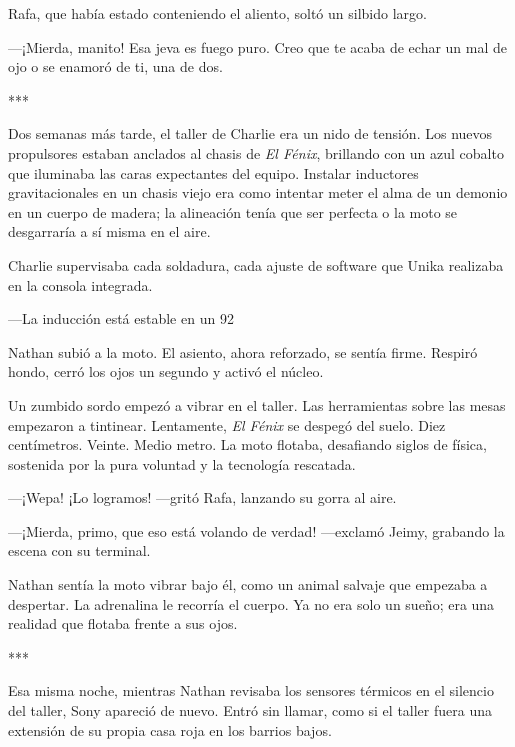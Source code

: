 \documentclass[11pt,twoside]{book}
\begin{document}
Rafa, que había estado conteniendo el aliento, soltó un silbido largo.

---¡Mierda, manito! Esa jeva es fuego puro. Creo que te acaba de echar un mal de ojo o se enamoró de ti, una de dos.

\bigskip
\begin{center}***\end{center}
\bigskip

Dos semanas más tarde, el taller de Charlie era un nido de tensión. Los nuevos propulsores estaban anclados al chasis de \textit{El Fénix}, brillando con un azul cobalto que iluminaba las caras expectantes del equipo. Instalar inductores gravitacionales en un chasis viejo era como intentar meter el alma de un demonio en un cuerpo de madera; la alineación tenía que ser perfecta o la moto se desgarraría a sí misma en el aire.

Charlie supervisaba cada soldadura, cada ajuste de software que Unika realizaba en la consola integrada.

---La inducción está estable en un 92%

Nathan subió a la moto. El asiento, ahora reforzado, se sentía firme. Respiró hondo, cerró los ojos un segundo y activó el núcleo.

Un zumbido sordo empezó a vibrar en el taller. Las herramientas sobre las mesas empezaron a tintinear. Lentamente, \textit{El Fénix} se despegó del suelo. Diez centímetros. Veinte. Medio metro. La moto flotaba, desafiando siglos de física, sostenida por la pura voluntad y la tecnología rescatada.

---¡Wepa! ¡Lo logramos! ---gritó Rafa, lanzando su gorra al aire.

---¡Mierda, primo, que eso está volando de verdad! ---exclamó Jeimy, grabando la escena con su terminal.

Nathan sentía la moto vibrar bajo él, como un animal salvaje que empezaba a despertar. La adrenalina le recorría el cuerpo. Ya no era solo un sueño; era una realidad que flotaba frente a sus ojos.

\bigskip
\begin{center}***\end{center}
\bigskip

Esa misma noche, mientras Nathan revisaba los sensores térmicos en el silencio del taller, Sony apareció de nuevo. Entró sin llamar, como si el taller fuera una extensión de su propia casa roja en los barrios bajos.
\end{document}
